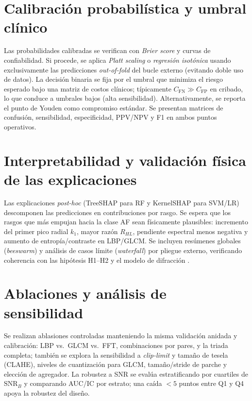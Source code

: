 \section*{Calibración probabilística y umbral clínico}
Las probabilidades calibradas se verifican con \emph{Brier score} y curvas de confiabilidad. Si procede, se aplica \emph{Platt scaling} o \emph{regresión isotónica} usando exclusivamente las predicciones \emph{out-of-fold} del bucle externo (evitando doble uso de datos). La decisión binaria se fija por el umbral que minimiza el riesgo esperado bajo una matriz de costos clínicos; típicamente $C_\mathrm{FN}\gg C_\mathrm{FP}$ en cribado, lo que conduce a umbrales bajos (alta sensibilidad). Alternativamente, se reporta el punto de Youden como compromiso estándar. Se presentan matrices de confusión, sensibilidad, especificidad, PPV/NPV y F1 en ambos puntos operativos.

\section*{Interpretabilidad y validación física de las explicaciones}
Las explicaciones \emph{post-hoc} (TreeSHAP para RF y KernelSHAP para SVM/LR) descomponen las predicciones en contribuciones por rasgo. Se espera que los rasgos que más empujan hacia la clase AF sean físicamente plausibles: incremento del primer pico radial $k_1$, mayor razón $R_{HL}$, pendiente espectral menos negativa y aumento de entropía/contraste en LBP/GLCM. Se incluyen resúmenes globales (\emph{beeswarm}) y análisis de casos límite (\emph{waterfall}) por pliegue externo, verificando coherencia con las hipótesis H1–H2 y el modelo de difracción \cite{Kiani2022TextureSurvey,Chen2022Photonics,Greenbaum2014STM}.

\section*{Ablaciones y análisis de sensibilidad}
Se realizan ablasiones controladas manteniendo la misma validación anidada y calibración: LBP vs.\ GLCM vs.\ FFT, combinaciones por pares, y la triada completa; también se explora la sensibilidad a \emph{clip-limit} y tamaño de tesela (CLAHE), niveles de cuantización para GLCM, tamaño/stride de parche y elección de agregador. La robustez a SNR se evalúa estratificando por cuartiles de $\mathrm{SNR}_B$ y comparando AUC/IC por estrato; una caída $< 5$ puntos entre Q1 y Q4 apoya la robustez del diseño.

